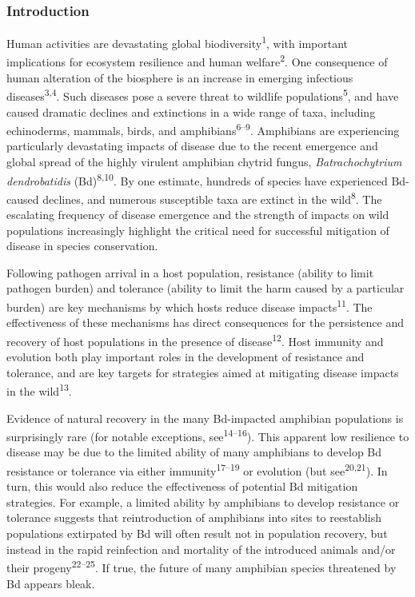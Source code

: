 \documentclass[
  letterpaper,
  DIV=11,
  numbers=noendperiod]{scrartcl}
\begin{document}
\subsubsection{Introduction}\label{introduction}

Human activities are devastating global biodiversity\textsuperscript{1},
with important implications for ecosystem resilience and human
welfare\textsuperscript{2}. One consequence of human alteration of the
biosphere is an increase in emerging infectious
diseases\textsuperscript{3,4}. Such diseases pose a severe threat to
wildlife populations\textsuperscript{5}, and have caused dramatic
declines and extinctions in a wide range of taxa, including echinoderms,
mammals, birds, and amphibians\textsuperscript{6--9}. Amphibians are
experiencing particularly devastating impacts of disease due to the
recent emergence and global spread of the highly virulent amphibian
chytrid fungus, \emph{Batrachochytrium dendrobatidis}
(Bd)\textsuperscript{8,10}. By one estimate, hundreds of species have
experienced Bd-caused declines, and numerous susceptible taxa are
extinct in the wild\textsuperscript{8}. The escalating frequency of
disease emergence and the strength of impacts on wild populations
increasingly highlight the critical need for successful mitigation of
disease in species conservation.

Following pathogen arrival in a host population, resistance (ability to
limit pathogen burden) and tolerance (ability to limit the harm caused
by a particular burden) are key mechanisms by which hosts reduce disease
impacts\textsuperscript{11}. The effectiveness of these mechanisms has
direct consequences for the persistence and recovery of host populations
in the presence of disease\textsuperscript{12}. Host immunity and
evolution both play important roles in the development of resistance and
tolerance, and are key targets for strategies aimed at mitigating
disease impacts in the wild\textsuperscript{13}.

Evidence of natural recovery in the many Bd-impacted amphibian
populations is surprisingly rare (for notable exceptions,
see\textsuperscript{14--16}). This apparent low resilience to disease
may be due to the limited ability of many amphibians to develop Bd
resistance or tolerance via either immunity\textsuperscript{17--19} or
evolution (but see\textsuperscript{20,21}). In turn, this would also
reduce the effectiveness of potential Bd mitigation strategies. For
example, a limited ability by amphibians to develop resistance or
tolerance suggests that reintroduction of amphibians into sites to
reestablish populations extirpated by Bd will often result not in
population recovery, but instead in the rapid reinfection and mortality
of the introduced animals and/or their progeny\textsuperscript{22--25}.
If true, the future of many amphibian species threatened by Bd appears
bleak.
\end{document}
